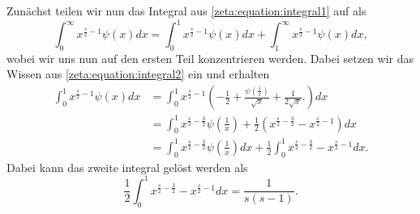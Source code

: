 Zunächst teilen wir nun das Integral aus \eqref{zeta:equation:integral1} auf als
\begin{equation}\label{zeta:equation:integral2}
    \int_0^{\infty}
    x^{\frac{s}{2}-1}
    \psi(x)
    dx
    =
    \int_0^{1}
    x^{\frac{s}{2}-1}
    \psi(x)
    dx
    +
    \int_1^{\infty}
    x^{\frac{s}{2}-1}
    \psi(x)
    dx,
\end{equation}
wobei wir uns nun auf den ersten Teil konzentrieren werden.
Dabei setzen wir das Wissen aus \eqref{zeta:equation:integral2} ein und erhalten
\begin{align}
    \int_0^{1}
    x^{\frac{s}{2}-1}
    \psi(x)
    dx
    &=
    \int_0^{1}
    x^{\frac{s}{2}-1}
    \left(
    - \frac{1}{2}
    + \frac{\psi\left(\frac{1}{x} \right)}{\sqrt{x}}
    + \frac{1}{2 \sqrt{x}}.
    \right)
    dx
    \\
    &=
    \int_0^{1}
    x^{\frac{s}{2}-\frac{3}{2}}
    \psi \left( \frac{1}{x} \right)
    + \frac{1}{2}
    \left(
    x^{\frac{s}{2}-\frac{3}{2}}
    -
    x^{\frac{s}{2}-1}
    \right)
    dx
    \\
    &=
    \int_0^{1}
    x^{\frac{s}{2}-\frac{3}{2}}
    \psi \left( \frac{1}{x} \right)
    dx
    + \frac{1}{2}
    \int_0^1
    x^{\frac{s}{2}-\frac{3}{2}}
    -
    x^{\frac{s}{2}-1}
    dx.
\end{align}
Dabei kann das zweite integral gelöst werden als
\begin{equation}
    \frac{1}{2}
    \int_0^1
    x^{\frac{s}{2}-\frac{3}{2}}
    -
    x^{\frac{s}{2}-1}
    dx
    =
    \frac{1}{s(s-1)}.
\end{equation}


